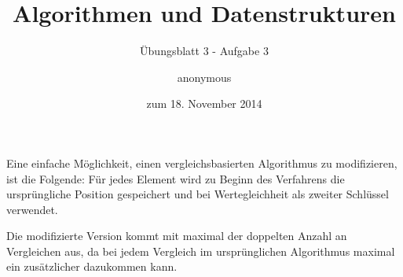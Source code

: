 \documentclass[a4paper]{scrartcl}
\title{Algorithmen und Datenstrukturen}
\subtitle{Übungsblatt 3 - Aufgabe 3}
\author{
    anonymous
}
\date{zum 18. November 2014}
\begin{document}
\maketitle

Eine einfache Möglichkeit, einen vergleichsbasierten Algorithmus zu
modifizieren, ist die Folgende:
Für jedes Element wird zu Beginn des Verfahrens die ursprüngliche Position
gespeichert und bei Wertegleichheit als zweiter Schlüssel verwendet.

Die modifizierte Version kommt mit maximal der doppelten Anzahl an Vergleichen
aus, da bei jedem Vergleich im ursprünglichen Algorithmus maximal ein
zusätzlicher dazukommen kann.
\end{document}
